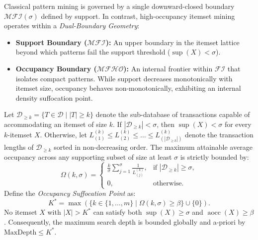 \documentclass[runningheads,orivec]{llncs}
\newcommand{\supp}{\operatorname{sup}}
\newcommand{\aocc}{\operatorname{aocc}}
\newcommand{\FI}{\ensuremath{\mathcal{FI}}}
\newcommand{\MFI}{\ensuremath{\mathcal{MFI}}}
\newcommand{\MFHOI}{\ensuremath{\mathcal{MFHO}}}
\begin{document}
Classical pattern mining is governed by a single downward-closed boundary $\MFI(\sigma)$ defined by support. In contrast, high-occupancy itemset mining operates within a \emph{Dual-Boundary Geometry}:
\begin{itemize}
    \item \textbf{Support Boundary ($\MFI$):} An upper boundary in the itemset lattice beyond which patterns fail the support threshold ($\supp(X) < \sigma$).
    \item \textbf{Occupancy Boundary ($\MFHOI$):} An internal frontier within $\FI$ that isolates compact patterns. While support decreases monotonically with itemset size, occupancy behaves non-monotonically, exhibiting an internal density suffocation point.
\end{itemize}

\begin{theorem}
\label{thm:suffocation}
Let $\mathcal{D}_{\ge k} = \{T \in \mathcal{D} \mid |T| \ge k\}$ denote the sub-database of transactions capable of accommodating an itemset of size $k$.
If $|\mathcal{D}_{\ge k}| < \sigma$, then $\supp(X) < \sigma$ for every $k$-itemset $X$.
Otherwise, let $L_{(1)}^{(k)} \le L_{(2)}^{(k)} \le \dots \le L_{(|\mathcal{D}_{\ge k}|)}^{(k)}$ denote the transaction lengths of $\mathcal{D}_{\ge k}$ sorted in non-decreasing order.
The maximum attainable average occupancy across any supporting subset of size at least $\sigma$ is strictly bounded by:
\begin{equation}
\label{eq:Omega}
\Omega(k, \sigma) = 
\begin{cases}
\frac{k}{\sigma} \sum_{j=1}^{\sigma} \frac{1}{L_{(j)}^{(k)}}, & \text{if } |\mathcal{D}_{\ge k}| \ge \sigma, \\
0, & \text{otherwise}.
\end{cases}
\end{equation}
Define the \emph{Occupancy Suffocation Point} as:
\begin{equation}
K^* = \max \left(\{k \in \{1, \dots, m\} \mid \Omega(k, \sigma) \ge \beta\} \cup \{0\}\right).
\end{equation}
No itemset $X$ with $|X| > K^*$ can satisfy both $\supp(X) \ge \sigma$ and $\aocc(X) \ge \beta$. Consequently, the maximum search depth is bounded globally and a-priori by $\mathrm{MaxDepth} \le K^*$.
\end{theorem}
\end{document}
